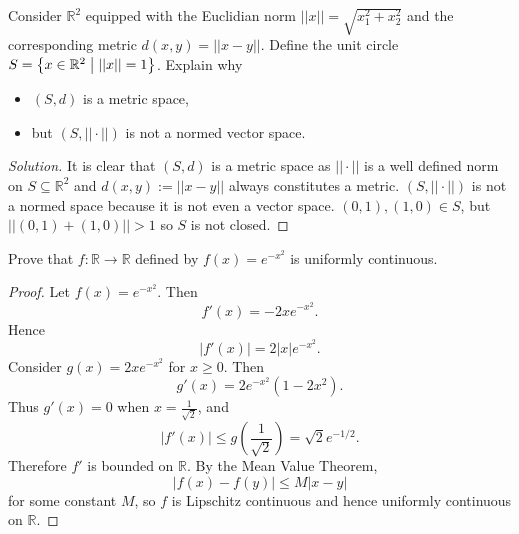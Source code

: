 \begin{prob}
    Consider $\mathbb R^2$ equipped with the Euclidian norm 
    $||x|| = \sqrt{x_1^2 + x_2^2}$ and the corresponding metric 
    $d(x,y) = ||x-y||$. Define the unit circle 
    $S = \left\{x \in \mathbb R^2 \bigm| ||x|| = 1\right\}$. 
    Explain why 
    \begin{itemize}
        \item $(S,d)$ is a metric space, 
        \item but $(S,||\cdot||)$ is not a normed vector space. 
    \end{itemize}
\end{prob}
\begin{proof}[Solution]
    It is clear that $(S,d)$ is a metric space as $||\cdot||$ is a 
    well defined norm on $S \subseteq \mathbb R^2$ and 
    $d(x,y) := ||x-y||$ always constitutes a metric. 
    $(S,||\cdot||)$ is not a normed space because it is not even 
    a vector space. $(0,1),(1,0) \in S$, but $||(0,1) + (1,0)|| > 1$
    so $S$ is not closed. 
\end{proof}
\begin{prob}
    Prove that $f:\mathbb R \to \mathbb R$ defined by 
    $f(x) = e^{-x^2}$ is uniformly continuous. 
\end{prob}
\begin{proof}
    Let $f(x) = e^{-x^2}$. Then
    \[
        f'(x) = -2x e^{-x^2}.
    \]
    Hence
    \[
        |f'(x)| = 2|x| e^{-x^2}.
    \]
    Consider $g(x) = 2x e^{-x^2}$ for $x \ge 0$. Then
    \[
        g'(x) = 2e^{-x^2}(1 - 2x^2).
    \]
    Thus $g'(x)=0$ when $x = \frac{1}{\sqrt{2}}$, and
    \[
        |f'(x)| \le g\!\left(\frac{1}{\sqrt{2}}\right)
        = \sqrt{2} e^{-1/2}.
    \]
    Therefore $f'$ is bounded on $\mathbb{R}$. By the Mean Value Theorem,
    \[
        |f(x)-f(y)| \le M |x-y|
    \]
    for some constant $M$, so $f$ is Lipschitz continuous and hence uniformly continuous on $\mathbb{R}$.
\end{proof}

\newpage 
